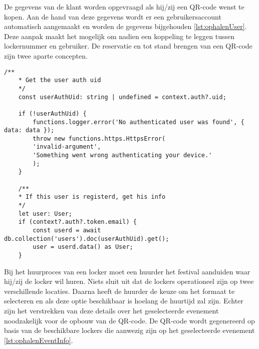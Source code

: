 \vspace{7}
De gegevens van de klant worden opgevraagd als hij/zij een QR-code wenst te kopen. Aan de hand van deze gegevens wordt er een gebruikersaccount automatisch aangemaakt en worden de gegevens bijgehouden \ref{lst:ophalenUser}. Deze aanpak maakt het mogelijk om nadien een koppeling te leggen tussen lockernummer en gebruiker. De reservatie en tot stand brengen van een QR-code zijn twee aparte concepten.
\begin{lstlisting}[caption={Ophalen de zopas aangemaakte gebruiker zijn gegevens indien hij in het huur proces terecht gekomen is.}, label={lst:ophalenUser}]
    /**
    * Get the user auth uid
    */
    const userAuthUid: string | undefined = context.auth?.uid;
    
    if (!userAuthUid) {
        functions.logger.error('No authenticated user was found', { data: data });
        throw new functions.https.HttpsError(
        'invalid-argument',
        'Something went wrong authenticating your device.'
        );
    }
    
    /**
    * If this user is registerd, get his info
    */
    let user: User;
    if (context?.auth?.token.email) {
        const userd = await db.collection('users').doc(userAuthUid).get();
        user = userd.data() as User;
    }
\end{lstlisting}

Bij het huurproces van een locker moet een huurder het festival aanduiden waar hij/zij de locker wil huren. Niets sluit uit dat de lockers operationeel zijn op twee verschillende locaties. Daarna heeft de huurder de keuze om het formaat te selecteren en als deze optie beschikbaar is hoelang de huurtijd zal zijn. Echter zijn het verstrekken van deze details over het geselecteerde evenement noodzakelijk voor de opbouw van de QR-code. De QR-code wordt gegenereerd op basis van de beschikbare lockers die aanwezig zijn op het geselecteerde evenement \ref{lst:ophalenEventInfo}.


